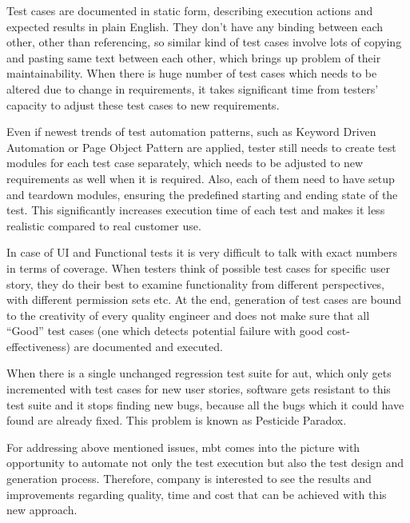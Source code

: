\par
Test cases are documented in static form, describing execution actions and expected results in plain English. They don't have any binding between each other, other than referencing, so similar kind of test cases involve lots of copying and pasting same text between each other, which brings up problem of their maintainability. When there is huge number of test cases which needs to be altered due to change in requirements, it takes significant time from testers' capacity to adjust these test cases to new requirements.

\par
Even if newest trends of test automation patterns, such as Keyword Driven Automation or Page Object Pattern are applied, tester still needs to create test modules for each test case separately, which needs to be adjusted to new requirements as well when it is required. Also, each of them need to have setup and teardown modules, ensuring the predefined starting and ending state of the test. This significantly increases execution time of each test and makes it less realistic compared to real customer use.

\par
In case of UI and Functional tests it is very difficult to talk with exact numbers in terms of coverage. When testers think of possible test cases for specific user story, they do their best to examine functionality from different perspectives, with different permission sets etc. At the end, generation of test cases are bound to the creativity of every quality engineer and does not make sure that all “Good” test cases (one which detects potential failure with good cost-effectiveness) are documented and executed.

\par
When there is a single unchanged regression test suite for \acrlong{aut}, which only gets incremented with test cases for new user stories, software gets resistant to this test suite and it stops finding new bugs, because all the bugs which it could have found are already fixed. This problem is known as Pesticide Paradox.

\par
For addressing above mentioned issues, \acrlong{mbt} comes into the picture with opportunity to automate not only the test execution but also the test design and generation process. Therefore, company is interested to see the results and improvements regarding quality, time and cost that can be achieved with this new approach.

